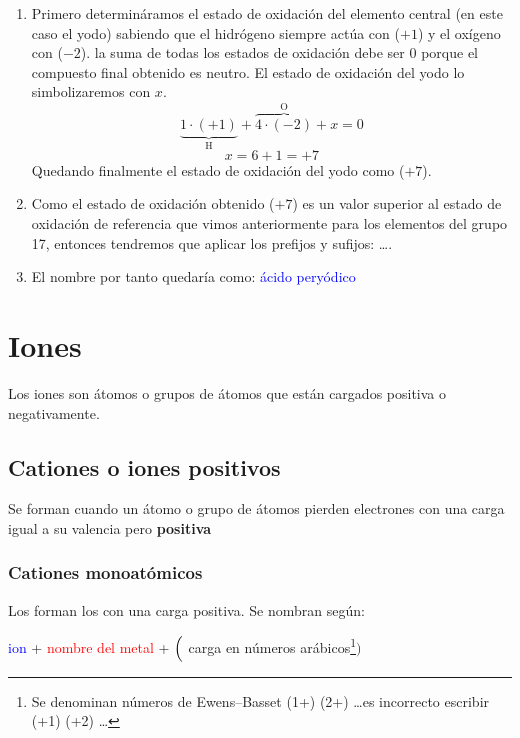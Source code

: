 \documentclass[11pt, a4paper]{article}
\begin{document}
\begin{enumerate}[label=\numberballgreen]
    \item Primero determináramos el estado de oxidación del elemento central (en este caso el yodo) sabiendo que el hidrógeno siempre actúa con ($+1$) y el oxígeno con ($-2$). la suma de todas los estados de oxidación debe ser $0$ porque el compuesto final obtenido es neutro. El estado de oxidación del yodo lo simbolizaremos con $x$.
          \begin{equation*}
              \underbrace{1\cdot(+1)}_{\text{H}} + \overbrace{4\cdot(-2)}^{\text{O}} + x = 0
          \end{equation*}
          \begin{equation*}
              x = 6+1 = +7
          \end{equation*}
          Quedando finalmente el estado de oxidación del yodo como ($+7$).
    \item Como el estado de oxidación obtenido ($+7$) es un valor superior al estado de oxidación de referencia que vimos anteriormente para los elementos del grupo 17, entonces tendremos que aplicar los prefijos y sufijos:  \dots {}.
    \item El nombre por tanto quedaría como: \textcolor{blue}{ácido peryódico}
\end{enumerate}

\section{Iones}

Los iones son átomos o grupos de átomos que están cargados positiva o negativamente.

\subsection{Cationes o iones positivos}

Se forman cuando un átomo o grupo de átomos pierden electrones con una carga igual a su valencia pero \textbf{positiva}

\subsubsection{Cationes monoatómicos}
Los forman los  con una carga positiva. Se nombran según:
\begin{center}
    \textcolor{blue}{ion} + \textcolor{red}{nombre del metal} + $\Bigl($ \textcolor{mygreen}{carga en números arábicos\footnote{Se denominan números de Ewens--Basset (1+) (2+) \dots es incorrecto escribir (+1) (+2) \dots}}$\Bigr)$
\end{center}
\end{document}
